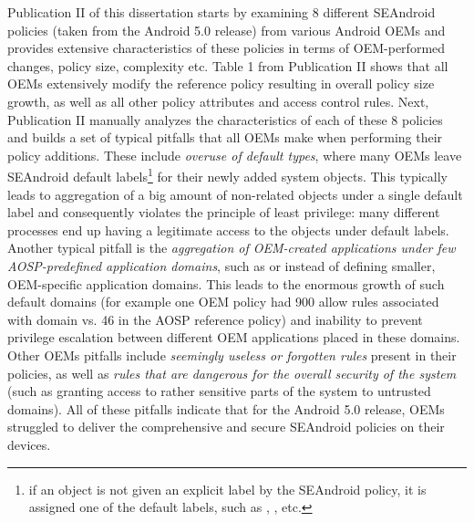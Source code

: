 Publication II of this dissertation starts by examining 8 different SEAndroid policies (taken from the Android 5.0 release) from various Android OEMs and provides extensive characteristics of these policies in terms of OEM-performed changes, policy size, complexity etc. Table 1 from Publication II shows that all OEMs extensively modify the reference policy resulting in overall policy size growth, as well as all other policy attributes and access control rules. Next, Publication II manually analyzes the characteristics of each of these 8 policies and builds a set of typical pitfalls that all OEMs make when performing their policy additions. These include \textit{overuse of default types}, where many OEMs leave SEAndroid default labels\footnote{if an object is not given an explicit label by the SEAndroid policy, it is assigned one of the default labels, such as , ,  etc.} for their newly added system objects. This typically leads to aggregation of a big amount of non-related objects under a single default label and consequently violates the principle of least privilege: many different processes end up having a legitimate access to the objects under default labels. Another typical pitfall is the \textit{aggregation of OEM-created applications under few AOSP-predefined application domains}, such as  or  instead of defining smaller, OEM-specific application domains. This leads to the enormous growth of such default domains (for example one OEM policy had 900 allow rules associated with  domain vs. 46 in the AOSP reference policy) and inability to prevent privilege escalation between different OEM applications placed in these domains. Other OEMs pitfalls include \textit{seemingly useless or forgotten rules} present in their policies, as well as \textit{rules that are dangerous for the overall security of the system} (such as granting access to rather sensitive parts of the system to untrusted domains). All of these pitfalls indicate that for the Android 5.0 release, OEMs struggled to deliver the comprehensive and secure SEAndroid policies on their devices. 

